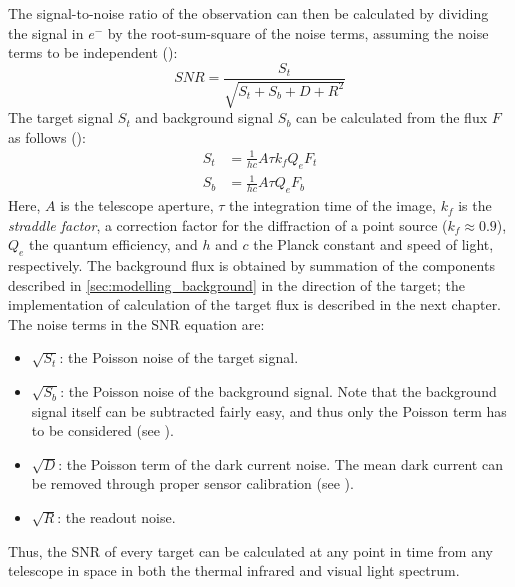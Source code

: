 The signal-to-noise ratio of the observation can then be calculated by dividing the signal in $e^-$ by the root-sum-square of the noise terms, assuming the noise terms to be independent (\cite{DetectionAndTracking}):
\begin{equation}
 SNR = \frac{S_t}{\sqrt{S_t + S_b + D + R^2}}
\end{equation}
The target signal $S_t$ and background signal $S_b$ can be calculated from the flux $F$ as follows (\cite{DetectionAndTracking}):
\begin{align}
 S_t &= \frac{1}{hc}A \tau k_f Q_e F_t \\
 S_b &= \frac{1}{hc}A \tau Q_e F_b
\end{align}
Here, $A$ is the telescope aperture, $\tau$ the integration time of the image, $k_f$ is the \textit{straddle factor}, a correction factor for the diffraction of a point source ($k_f \approx 0.9$), $Q_e$ the quantum efficiency, and $h$ and $c$ the Planck constant and speed of light, respectively. The background flux is obtained by summation of the components described in \autoref{sec:modelling_background} in the direction of the target; the implementation of calculation of the target flux is described in the next chapter. The noise terms in the SNR equation are:
\begin{itemize}
 \item $\sqrt{S_t}$: the Poisson noise of the target signal.
 \item $\sqrt{S_b}$: the Poisson noise of the background signal. Note that the background signal itself can be subtracted fairly easy, and thus only the Poisson term has to be considered (see \cite{StarRemoval}).
 \item $\sqrt{D}$: the Poisson term of the dark current noise. The mean dark current can be removed through proper sensor calibration (see \cite{OpNav}).
 \item $\sqrt{R}$: the readout noise.
\end{itemize}

Thus, the SNR of every target can be calculated at any point in time from any telescope in space in both the thermal infrared and visual light spectrum.

